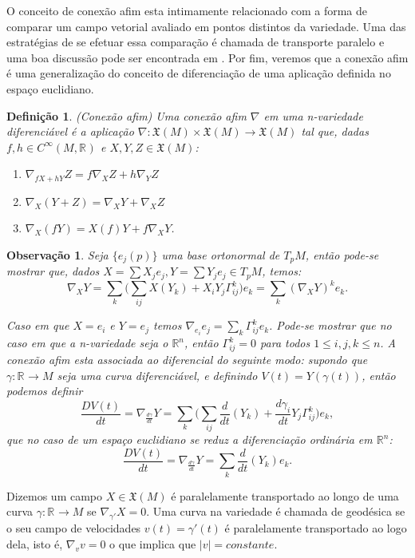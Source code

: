 \documentclass[12pt]{book}
\newtheorem{definicao}[teorema]{Definição}
\newtheorem{observacao}[teorema]{Observação}
\newcommand{\campossuaves}[1]{\mathfrak{X}(#1)}
\newcommand{\funcoessuaves}[1]{C^{\infty}(#1, \real{})}
\newcommand{\real}[1]{\mathbb{R}^{#1}}
\begin{document}
	O conceito de conexão afim esta intimamente relacionado com a forma de comparar um campo vetorial avaliado em pontos distintos da variedade. Uma das estratégias de se efetuar essa comparação é chamada de transporte paralelo e uma boa discussão pode ser encontrada em \cite{nakahara}. Por fim, veremos que a conexão afim é uma generalização do conceito de diferenciação de uma aplicação definida no espaço euclidiano.
	
	\begin{definicao}
		(Conexão afim) Uma conexão afim $\nabla$ em uma n-variedade diferenciável é a aplicação $\nabla: \campossuaves{M} \times \campossuaves{M} \to \campossuaves{M}$ tal que, dadas $f,h \in \funcoessuaves{M}$ e $X,Y,Z \in \campossuaves{M}$:
		\begin{enumerate}
			\item $\nabla_{fX+hY}Z = f\nabla_{X}Z+h\nabla_{Y}Z$
			\item $\nabla_{X}(Y+Z) = \nabla_{X}Y+ \nabla_{X}Z$
			\item $\nabla_{X}(fY) = X(f)Y+f\nabla_{X}Y$.
		\end{enumerate}
	\end{definicao}
	
	\begin{observacao}
		Seja $\{e_{j}(p)\}$ uma base ortonormal de $T_{p}M$, então pode-se mostrar que, dados $X=\sum X_{j}e_{j}, Y=\sum Y_{j}e_{j} \in T_{p}M$, temos:
		$$
		\nabla_{X}Y = \sum_{k} \Big( \sum_{ij} X(Y_{k}) + X_{i}Y_{j} \Gamma^{k}_{ij}\Big)e_{k} = \sum_{k} (\nabla_{X}Y)^{k}e_{k}. 
		$$
		
		Caso em que $X=e_{i}$ e $Y=e_{j}$ temos $\nabla_{e_{i}}e_{j}=\sum_{k}\Gamma_{ij}^{k}e_{k}$. Pode-se mostrar que no caso em que a n-variedade seja o $\real{n}$, então $\Gamma_{ij}^{k}=0$ para todos $1\leq i,j,k \leq n$. A conexão afim esta associada ao diferencial do seguinte modo: supondo que $\gamma:\real{} \to M$ seja uma curva diferenciável, e definindo $V(t) = Y(\gamma(t))$, então podemos definir 
		$$
		\frac{D V(t)}{dt} = \nabla_{\frac{d\gamma}{dt}}Y = \sum_{k}\Big( \sum_{ij} \frac{d}{dt}(Y_{k}) + \frac{d\gamma_{i}}{dt}Y_{j} \Gamma^{k}_{ij}\Big)e_{k},
		$$
		que no caso de um espaço euclidiano se reduz a diferenciação ordinária em $\real{n}$:
		$$
		\frac{D V(t)}{dt} = \nabla_{\frac{d\gamma}{dt}}Y = \sum_{k} \frac{d}{dt}(Y_{k}) e_{k}.
		$$		
	\end{observacao}
	
	Dizemos um campo $X \in \campossuaves{M}$ é paralelamente transportado ao longo de uma curva $\gamma:\real{} \to M$ se $\nabla_{\gamma'}X=0$. Uma curva na variedade é chamada de geodésica se o seu campo de velocidades $v(t) = \gamma'(t)$ é paralelamente transportado ao logo dela, isto é, $\nabla_{v}v=0$ o que implica que $|v| = constante$.
	
\end{document}
